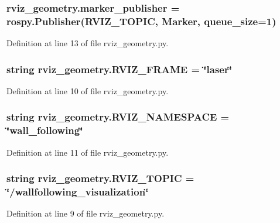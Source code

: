 \subsubsection[{\texorpdfstring{marker\+\_\+publisher}{marker_publisher}}]{\setlength{\rightskip}{0pt plus 5cm}rviz\+\_\+geometry.\+marker\+\_\+publisher = rospy.\+Publisher({\bf R\+V\+I\+Z\+\_\+\+T\+O\+P\+IC}, Marker, queue\+\_\+size=1)}\hypertarget{namespacerviz__geometry_ac4b20d63343627f7ac14151eba108ba8}{}\label{namespacerviz__geometry_ac4b20d63343627f7ac14151eba108ba8}


Definition at line 13 of file rviz\+\_\+geometry.\+py.

\subsubsection[{\texorpdfstring{R\+V\+I\+Z\+\_\+\+F\+R\+A\+ME}{RVIZ_FRAME}}]{\setlength{\rightskip}{0pt plus 5cm}string rviz\+\_\+geometry.\+R\+V\+I\+Z\+\_\+\+F\+R\+A\+ME = \char`\"{}laser\char`\"{}}\hypertarget{namespacerviz__geometry_a3a3837887cc012683c1d87e5027b6863}{}\label{namespacerviz__geometry_a3a3837887cc012683c1d87e5027b6863}


Definition at line 10 of file rviz\+\_\+geometry.\+py.

\subsubsection[{\texorpdfstring{R\+V\+I\+Z\+\_\+\+N\+A\+M\+E\+S\+P\+A\+CE}{RVIZ_NAMESPACE}}]{\setlength{\rightskip}{0pt plus 5cm}string rviz\+\_\+geometry.\+R\+V\+I\+Z\+\_\+\+N\+A\+M\+E\+S\+P\+A\+CE = \char`\"{}wall\+\_\+following\char`\"{}}\hypertarget{namespacerviz__geometry_ad8626a9cfbc948e43f401fb1f3d62ecb}{}\label{namespacerviz__geometry_ad8626a9cfbc948e43f401fb1f3d62ecb}


Definition at line 11 of file rviz\+\_\+geometry.\+py.

\subsubsection[{\texorpdfstring{R\+V\+I\+Z\+\_\+\+T\+O\+P\+IC}{RVIZ_TOPIC}}]{\setlength{\rightskip}{0pt plus 5cm}string rviz\+\_\+geometry.\+R\+V\+I\+Z\+\_\+\+T\+O\+P\+IC = \char`\"{}/wallfollowing\+\_\+visualization\char`\"{}}\hypertarget{namespacerviz__geometry_a2bfe028bdabf1321495ece3cfc6b4fa6}{}\label{namespacerviz__geometry_a2bfe028bdabf1321495ece3cfc6b4fa6}


Definition at line 9 of file rviz\+\_\+geometry.\+py.

